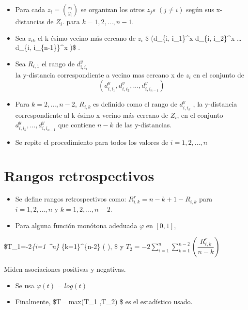\documentclass[]{book}
\begin{document}
\begin{itemize}
\item
  Para cada \(z_i = \binom {x_i}{y_i}\) se organizan los otros \(z_js\)
  \((j\neq i)\) según sus x- distancias de \(Z_i\). para
  \(k= 1,2, ... , n-1\).
\item
  Sea \(z_{ik}\) el k-ésimo vecino más cercano de \(z_i\) \$ (d\_\{i,
  i\_1\}\^{}x \leq d\_\{i, i\_2\}\^{}x \leq \ldots{} \leq d\_\{i,
  i\_\{n-1\}\}\^{}x )\$ .
\item
  Sea \(R_{i,1}\) el rango de \(d_{i,i_1}^y\)\\
  la y-distancia correspondiente a vecino mas cercano x de \(z_i\) en el
  conjunto de
  \[ (d_{i, i_1}^y  ,  d_{i, i_2}^y ,...  , d_{i, i_{n-1}}^y  )\]
\item
  Para \(k= 2, ..., n-2\), \(R_{i,k}\) es definido como el rango de
  \(d_{i,i_k}^y\) , la y-distancia correspondiente al k-ésimo x-vecino
  más cercano de \(Z_i\), en el conjunto
  \({d_{i,i_k}^y, ... , d_{i, i_{n-1}}^y}\) que contiene \(n-k\) de las
  y-distancias.
\item
  Se repite el procedimiento para todos los valores de
  \(i = 1, 2,..., n\)
\end{itemize}

\section{Rangos retrospectivos}\label{rangos-retrospectivos}

\begin{itemize}
\item
  Se define rangos retrospectivos como: \(R_{i,k}^r = n-k+1 - R_{i,k}\)
  para \(i=1,2,...,n\) y \(k = 1,2, ... , n-2\).
\item
  Para alguna función monótona adeduada \(\varphi\) en \([0,1]\),
\end{itemize}

\$T\_1=-2\displaystyle \sum\emph{\{i=1 \^{}n\} \sum}\{k=1\}\^{}\{n-2\}
\varphi \left( \right), \$ y
\(T_2= -2 \displaystyle \sum_{i=1}^n \sum_{k=1}^{n-2} \left( \dfrac{R_{i,k} ^r}{n-k} \right)\)

Miden asociaciones positivas y negativas.

\begin{itemize}
\item
  Se usa \(\varphi(t) = log(t)\)
\item
  Finalmente, \$T= max(T\_1 ,T\_2) \$ es el estadístico usado.
\end{itemize}
\end{document}

